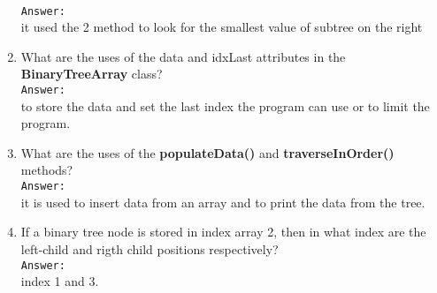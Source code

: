 \documentclass[12pt,titlepage]{article}
\begin{document}
\begin{enumerate}
    \mbox{}\\ \texttt{Answer:} \mbox{}\\
    it used the 2 method to look for the smallest value of subtree on the right
    \item What are the uses of the data and idxLast attributes in the \textbf{BinaryTreeArray} class?
    \mbox{}\\ \texttt{Answer:} \mbox{}\\
    to store the data and set the last index the program can use or to limit the program.
    \item What are the uses of the \textbf{populateData()} and \textbf{traverseInOrder()} methods?
    \mbox{}\\ \texttt{Answer:} \mbox{}\\
    it is used to insert data from an array and to print the data from the tree.
    \item If a binary tree node is stored in index array 2, then in what index are the left-child and rigth child positions respectively?
    \mbox{}\\ \texttt{Answer:} \mbox{}\\
    index 1 and 3.
\end{enumerate}
\end{document}
